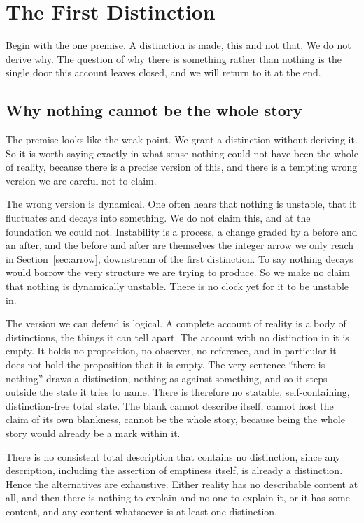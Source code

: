 \section{The First Distinction} \label{sec:firstdistinction}

Begin with the one premise. A distinction is made, this and not that. We do not derive why. The question of why there
is something rather than nothing is the single door this account leaves closed, and we will return to it at the end.

\subsection{Why nothing cannot be the whole story}

The premise looks like the weak point. We grant a distinction without deriving it. So it is worth saying exactly in
what sense nothing could not have been the whole of reality, because there is a precise version of this, and there is a
tempting wrong version we are careful not to claim.

The wrong version is dynamical. One often hears that nothing is unstable, that it fluctuates and decays into something.
We do not claim this, and at the foundation we could not. Instability is a process, a change graded by a before and an
after, and the before and after are themselves the integer arrow we only reach in Section~\ref{sec:arrow}, downstream
of the first distinction. To say nothing decays would borrow the very structure we are trying to produce. So we make no
claim that nothing is dynamically unstable. There is no clock yet for it to be unstable in.

The version we can defend is logical. A complete account of reality is a body of distinctions, the things it can tell
apart. The account with no distinction in it is empty. It holds no proposition, no observer, no reference, and in
particular it does not hold the proposition that it is empty. The very sentence ``there is nothing'' draws a
distinction, nothing as against something, and so it steps outside the state it tries to name. There is therefore no
statable, self-containing, distinction-free total state. The blank cannot describe itself, cannot host the claim of its
own blankness, cannot be the whole story, because being the whole story would already be a mark within it.

\begin{principle}
There is no consistent total description that contains no distinction, since any description, including the assertion
of emptiness itself, is already a distinction. Hence the alternatives are exhaustive. Either reality has no describable
content at all, and then there is nothing to explain and no one to explain it, or it has some content, and any content
whatsoever is at least one distinction.
\end{principle}

